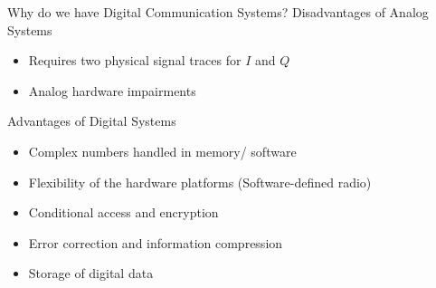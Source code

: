 \begin{frame}{Why do we have Digital Communication Systems?}
    Disadvantages of Analog Systems
    \begin{itemize}
        \item Requires two physical signal traces for $I$ and $Q$
        \item Analog hardware impairments
    \end{itemize}
    Advantages of Digital Systems
    \begin{itemize}
        \item Complex numbers handled in memory/ software
        \item Flexibility of the hardware platforms (Software-defined radio)
        \item Conditional access and encryption
        \item Error correction and information compression
        \item Storage of digital data
    \end{itemize}
\end{frame}

